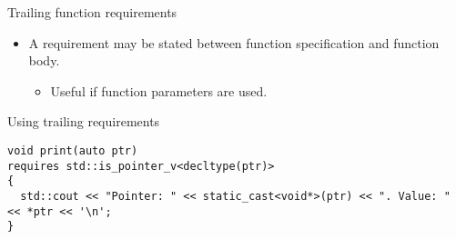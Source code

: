 \begin{frame}[t,fragile]{Trailing function requirements}
\begin{itemize}
  \item A requirement may be stated between function specification and function body.
    \begin{itemize}
      \item Useful if function parameters are used.
    \end{itemize}
\end{itemize}

\begin{block}{Using trailing requirements}
\begin{lstlisting}
void print(auto ptr)
requires std::is_pointer_v<decltype(ptr)>
{
  std::cout << "Pointer: " << static_cast<void*>(ptr) << ". Value: " << *ptr << '\n';
}
\end{lstlisting}
\end{block}
\end{frame}
